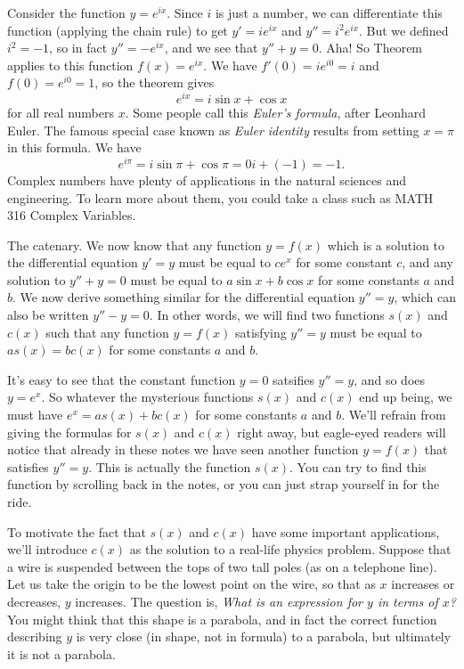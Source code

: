 Consider the function $y=e^{i x}$. Since $i$ is just a number, we can differentiate this function (applying
the chain rule) to get $y' = i e^{ix}$ and $y''= i^2 e^{ix}$. But we defined $i^2 = -1$, so in fact
$y'' = -e^{ix}$, and we see that $y''+y = 0$. Aha! So Theorem~{\thmcharacterisetrig} applies to this function
$f(x) =e^{ix}$. We have $f'(0) = i e^{i0} = i$ and $f(0) = e^{i0} = 1$, so the theorem gives
$$e^{ix} = i\sin x + \cos x$$
for all real numbers $x$. Some people call this {\it Euler's formula}, after Leonhard Euler.
The famous special case known as {\it Euler identity} results from setting $x=\pi$ in this formula. We have
$$e^{i\pi} = i\sin \pi + \cos \pi = 0i + (-1) = -1.$$
Complex numbers have plenty of applications in the natural sciences and engineering.
To learn more about them, you could take a class such as {\mc MATH} 316 Complex Variables.

\medskip\boldlabel The catenary.
We now know that any function $y = f(x)$ which is a
solution to the differential equation $y' = y$ must be equal to $ce^x$ for some
constant $c$, and any solution to $y'' + y = 0$ must be equal to $a\sin x + b\cos x$
for some constants $a$ and $b$. We now derive something similar for
the differential equation  $y'' = y$, which can also be written $y'' - y = 0$. In other words,
we will find two functions $s(x)$ and $c(x)$ such that any function $y=f(x)$ satisfying $y'' = y$ must
be equal to $a s(x) = bc(x)$ for some constants $a$ and $b$.

It's easy to see that the constant function $y=0$ satsifies $y'' = y$, and so does $y=e^x$. So whatever the
mysterious functions
$s(x)$ and $c(x)$ end up being, we must have $e^x = a s(x)  + bc(x)$ for some constants $a$ and $b$.
We'll refrain from giving the formulas for $s(x)$ and $c(x)$ right away, but eagle-eyed readers will
notice that already in these notes we have seen another function $y=f(x)$ that satisfies $y'' = y$. This is
actually the function $s(x)$. You can try to find this function by scrolling back in the notes, or you
can just strap yourself in for the ride.

To motivate the fact that $s(x)$ and $c(x)$ have some important applications,
we'll introduce $c(x)$ as the solution to a
real-life physics problem. Suppose that a wire is suspended between the tops of two tall poles (as
on a telephone line). Let us take the origin to be the lowest point on the wire, so that as $x$ increases
or decreases, $y$ increases. The question is, {\sl What is an expression for $y$ in terms of $x$?}
You might think that this shape is a parabola, and in fact the correct function describing $y$ is very
close (in shape, not in formula) to a parabola, but ultimately it is not a parabola.

